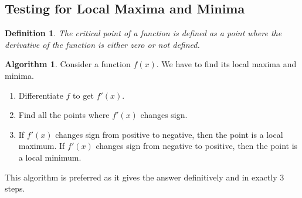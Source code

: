 \documentclass[14]{article}
\newtheorem{define}{Definition}
\theoremstyle{definition}
\newtheorem{algo}{Algorithm}
\theoremstyle{case}
\begin{document}
\subsection{Testing for Local Maxima and Minima}
\begin{define}
The critical point of a function is defined as a point where the derivative of the function is either zero or not defined.
\end{define}
\begin{algo}
Consider a function $f(x)$. We have to find its local maxima and minima.
\begin{enumerate}
\item Differentiate $f$ to get $f'(x)$.
\item Find all the points where $f'(x)$ changes sign.
\item If $f'(x)$ changes sign from positive to negative, then the point is a local maximum. If $f'(x)$ changes sign from negative to positive, then the point is a local minimum.
\end{enumerate}
This algorithm is preferred as it gives the answer definitively and in exactly 3 steps.
\end{algo}
\end{document}
